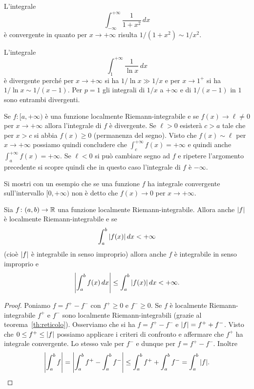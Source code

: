 \begin{example}
L'integrale
\[
  \int_{-\infty}^{+\infty}\frac{1}{1+x^2}\, dx
\]
è convergente in quanto per $x\to +\infty$ risulta $1/(1+x^2) \sim 1/x^2$.

L'integrale
\[
  \int_1^{+\infty} \frac{1}{\ln x}\, dx
\]
è divergente perché per $x\to +\infty$
si ha $1/\ln x \gg 1/x$ e per $x\to 1^+$ si ha
$1/\ln x \sim 1/(x-1)$. Per $p=1$ gli integrali
di $1/x$ a $+\infty$ e di $1/(x-1)$ in $1$
sono entrambi divergenti.

Se $f\colon [a,+\infty)$ è una funzione localmente Riemann-integrabile
e se $f(x)\to \ell \neq 0$ per $x\to +\infty$ allora l'integrale
di $f$ è divergente. Se $\ell>0$ esisterà $c>a$ tale che per $x>c$
si abbia $f(x)\ge 0$ (permanenza del segno). Visto che
$f(x)\sim \ell$ per $x\to +\infty$ possiamo quindi concludere
che $\int_c^{+\infty} f(x) = +\infty$ e
quindi anche
$\int_a^{+\infty} f(x) = +\infty$.
Se $\ell<0$ si può cambiare segno ad $f$ e ripetere l'argomento precedente
si scopre quindi che in questo caso l'integrale di $f$ è $-\infty$.
\end{example}

\begin{exercise}
Si mostri con un esempio che se una funzione $f$ ha integrale
convergente sull'intervallo $[0,+\infty)$ non
è detto che $f(x)\to 0$ per $x\to +\infty$.
\end{exercise}

\begin{comment}
\begin{exercise}[difficile]
Mostrare che l'integrale
\[
  \int_0^{+\infty} \exp\enclose{x^2 \ln \frac{2+\cos(2\pi x)}{3}} \, dx
\]
è finito. Ma la funzione integranda non tende a zero per $x\to +\infty$.
\end{exercise}
\end{comment}

\begin{theorem}
\label{th:convergenza_assoluta_integrale}
\mymark{**}%
Sia $f\colon (a,b)\to \mathbb R$ una funzione localmente Riemann-integrabile.
Allora anche ${\left|f\right|}$ è localmente Riemann-integrabile e se
\[
\int_a^b {\left|f(x)\right|}\, dx < +\infty
\]
(cioè ${\left|f\right|}$ è integrabile in senso improprio)
allora anche $f$ è integrabile in senso improprio e
\[
  {\left|\int_a^b f(x)\,dx\right|}
  \le \int_a^b {\left|f(x)\right|}\, dx < +\infty.
\]
\end{theorem}
%
%
\begin{proof}
Poniamo $f = f^+ - f^-$ con $f^+\ge 0$ e $f^-\ge 0$.
Se $f$ è localmente Riemann-integrabile
$f^+$ e $f^-$ sono localmente Riemann-integrabili
(grazie al teorema~\ref{th:reticolo}).
Osserviamo che si ha $f = f^+ - f^-$
e ${\left|f\right|} = f^+ + f^-$.
Visto che $0\le f^+ \le {\left|f\right|}$ possiamo
applicare i criteri di confronto e
affermare che $f^+$ ha integrale convergente.
Lo stesso vale per $f^-$ e dunque per $f=f^+ - f^-$.
Inoltre
\[
  {\left|\int_a^b f \right|}
  = {\left|\int_a^b f^+ - \int_a^b f^-\right|}
  \le \int_a^b f^+ + \int_a^b f^-
  = \int_a^b {\left|f\right|}.
\]
\end{proof}

